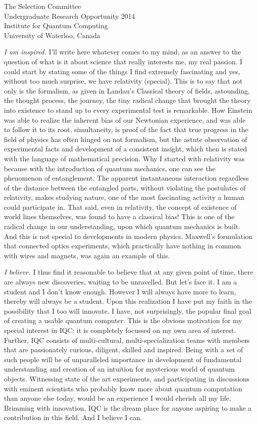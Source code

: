 \documentclass{letter}
\begin{document}
\begin{letter}{The Selection Committee\\Undergraduate Research Opportunity 2014\\Institute for Quantum Computing\\University of Waterloo, Canada}
\begin{enumerate}
\emph{I am inspired.} I'll write here whatever comes to my mind, as an answer to the question of what is it about science that really interests me, my real passion. I could start by stating some of the things I find extremely fascinating and yes, without too much surprise, we have relativity (special). This is to say that not only is the formalism, as given in Landau's Classical theory of fields, astounding, the thought process, the journey, the tiny radical change that brought the theory into existence to stand up to every experimental test is remarkable. How Einstein was able to realize the inherent bias of our Newtonian experience, and was able to follow it to its root, simultaneity, is proof of the fact that true progress in the field of physics has often hinged on not formalism, but the astute observation of experimental facts and development of a consistent insight, which then is stated with the language of mathematical precision. Why I started with relativity was because with the introduction of quantum mechanics, one can see the phenomenon of entanglement. The apparent instantaneous interaction regardless of the distance between the entangled parts, without violating the postulates of relativity, makes studying nature, one of the most fascinating activity a human could participate in. That said, even in relativity, the concept of existence of world lines themselves, was found to have a classical bias! This is one of the radical change in our understanding, upon which quantum mechanics is built. And this is not special to developments in modern physics. Maxwell's formulation that connected optics experiments, which practically have nothing in common with wires and magnets, was again an example of this.

\emph{I believe.} I thus find it reasonable to believe that at any given point of time, there are always new discoveries, waiting to be unravelled. But let's face it. I am a student and I don't know enough. However I will always have more to learn, thereby will always be a student. Upon this realization I have put my faith in the possibility that I too will innovate. I have, not surprisingly, the popular final goal of creating a usable quantum computer. This is the obvious motivation for my special interest in IQC; it is completely focussed on my own area of interest. Further, IQC consists of multi-cultural, multi-specialization teams with members that are passionately curious, diligent, skilled and inspired. Being with a set of such people will be of unparalleled importance in development of fundamental understanding and creation of an intuition for mysterious world of quantum objects. Witnessing state of the art experiments, and participating in discussions with eminent scientists who probably know more about quantum computation than anyone else today, would be an experience I would cherish all my life. Brimming with innovation, IQC is the dream place for anyone aspiring to make a contribution in this field. And I believe I can.



\end{enumerate}
\end{letter}
\end{document}
